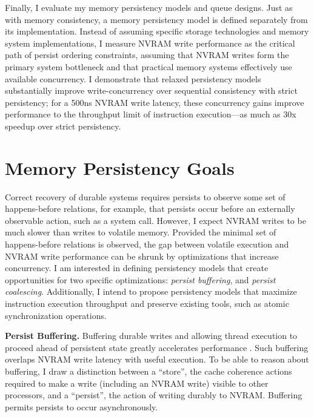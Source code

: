 Finally, I evaluate my memory persistency models and queue designs.
Just as with memory consistency, a memory persistency model is defined separately from its implementation.
Instead of assuming specific storage technologies and memory system implementations, I measure NVRAM write performance as the critical path of persist ordering constraints, assuming that NVRAM writes form the primary system bottleneck and that practical memory systems effectively use available concurrency.
I demonstrate that relaxed persistency models substantially improve write-concurrency over sequential consistency with strict persistency; for a 500ns NVRAM write latency, these concurrency gains improve performance to the throughput limit of instruction execution---as much as 30x speedup over strict persistency.

\section{Memory Persistency Goals}
\label{sec:Persistency:Goals}

Correct recovery of durable systems requires persists to observe some set of happens-before relations, for example, that persists occur before an externally observable action, such as a system call.  
However, I expect NVRAM writes to be much slower than writes to volatile memory.
Provided the minimal set of happens-before relations is observed, the gap between volatile execution and NVRAM write performance can be shrunk by optimizations that increase concurrency. 
I am interested in defining persistency models that create opportunities for two specific optimizations: \emph{persist buffering}, and \emph{persist coalescing}.
Additionally, I intend to propose persistency models that maximize instruction execution throughput and preserve existing tools, such as atomic synchronization operations.

\textbf{Persist Buffering.}
Buffering durable writes and allowing thread execution to proceed ahead of persistent state greatly accelerates performance \cite{Condit09}.
Such buffering overlaps NVRAM write latency with useful execution. 
To be able to reason about buffering, I draw a distinction between a ``store'', the cache coherence actions required to make a write (including an NVRAM write) visible to other processors, and a ``persist'', the action of writing durably to NVRAM.
Buffering permits persists to occur asynchronously.  

